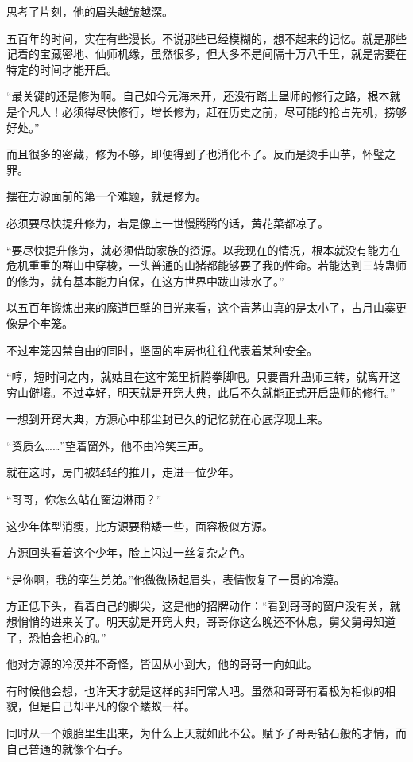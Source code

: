 \begin{this_body}
思考了片刻，他的眉头越皱越深。

五百年的时间，实在有些漫长。不说那些已经模糊的，想不起来的记忆。就是那些记着的宝藏密地、仙师机缘，虽然很多，但大多不是间隔十万八千里，就是需要在特定的时间才能开启。

“最关键的还是修为啊。自己如今元海未开，还没有踏上蛊师的修行之路，根本就是个凡人！必须得尽快修行，增长修为，赶在历史之前，尽可能的抢占先机，捞够好处。”

而且很多的密藏，修为不够，即便得到了也消化不了。反而是烫手山芋，怀璧之罪。

摆在方源面前的第一个难题，就是修为。

必须要尽快提升修为，若是像上一世慢腾腾的话，黄花菜都凉了。

“要尽快提升修为，就必须借助家族的资源。以我现在的情况，根本就没有能力在危机重重的群山中穿梭，一头普通的山猪都能够要了我的性命。若能达到三转蛊师的修为，就有基本能力自保，在这方世界中跋山涉水了。”

以五百年锻炼出来的魔道巨擘的目光来看，这个青茅山真的是太小了，古月山寨更像是个牢笼。

不过牢笼囚禁自由的同时，坚固的牢房也往往代表着某种安全。

“哼，短时间之内，就姑且在这牢笼里折腾拳脚吧。只要晋升蛊师三转，就离开这穷山僻壤。不过幸好，明天就是开窍大典，此后不久就能正式开启蛊师的修行。”

一想到开窍大典，方源心中那尘封已久的记忆就在心底浮现上来。

“资质么……”望着窗外，他不由冷笑三声。

就在这时，房门被轻轻的推开，走进一位少年。

“哥哥，你怎么站在窗边淋雨？”

这少年体型消瘦，比方源要稍矮一些，面容极似方源。

方源回头看着这个少年，脸上闪过一丝复杂之色。

“是你啊，我的孪生弟弟。”他微微扬起眉头，表情恢复了一贯的冷漠。

方正低下头，看着自己的脚尖，这是他的招牌动作：“看到哥哥的窗户没有关，就想悄悄的进来关了。明天就是开窍大典，哥哥你这么晚还不休息，舅父舅母知道了，恐怕会担心的。”

他对方源的冷漠并不奇怪，皆因从小到大，他的哥哥一向如此。

有时候他会想，也许天才就是这样的非同常人吧。虽然和哥哥有着极为相似的相貌，但是自己却平凡的像个蝼蚁一样。

同时从一个娘胎里生出来，为什么上天就如此不公。赋予了哥哥钻石般的才情，而自己普通的就像个石子。


\end{this_body}
